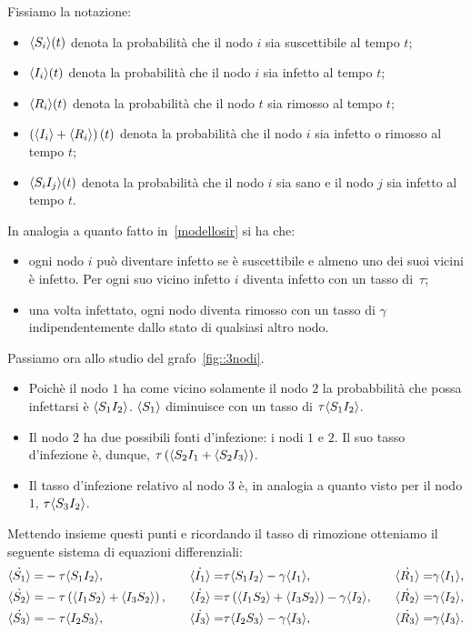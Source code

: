 Fissiamo la notazione:
\begin{itemize}
	\item  $\langle S_i \rangle(t)$  denota la probabilit\`a che il nodo $i$ sia suscettibile al tempo $t$;
	\item   $\langle I_i \rangle(t)$  denota la probabilit\`a che il nodo $i$ sia infetto al tempo $t$;
	\item  $\langle R_i \rangle(t)$  denota la probabilit\`a che il nodo $t$ sia rimosso al tempo $t$;
	\item $\left(  \langle  I_i \rangle+ \langle  R_i \rangle \right)(t)$ denota la probabilit\`a che il nodo $i$ sia infetto o rimosso al tempo $t$;
	\item $\langle S_iI_j \rangle(t)$ denota la probabilit\`a che il nodo $i$ sia sano e il nodo $j$ sia infetto al tempo $t$.
	\end{itemize}
In analogia a quanto fatto in~\ref{modellosir} si ha che:
\begin{itemize}
	\item ogni nodo $i$ pu\`o diventare infetto se \`e suscettibile e almeno uno dei suoi vicini \`e infetto. Per ogni suo vicino infetto $i$ diventa infetto con un tasso di~$\tau$;
	\item una volta infettato, ogni nodo diventa rimosso con un tasso di $\gamma$ indipendentemente dallo stato di qualsiasi altro nodo.
\end{itemize}
\newpage
Passiamo ora allo studio del grafo~\ref{fig::3nodi}.
\begin{itemize}
	

\item Poich\`e il nodo $1$ ha come vicino solamente il nodo $2$ la probabbilit\`a che possa infettarsi \`e $\langle S_1 I_2 \rangle $. $\langle S_1 \rangle$ diminuisce con un tasso di $\tau \langle S_1 I_2 \rangle$.
\item Il nodo $2$ ha due possibili fonti d'infezione: i nodi $1$ e $2$. Il suo tasso d'infezione \`e, dunque,  $\tau \left(  \langle{S_2I_1} + \langle S_2 I_3 \rangle \right)$.
\item Il tasso d'infezione relativo al nodo $3$ \`e,  
in analogia a quanto visto per il nodo $1$, $\tau\langle S_3I_2 \rangle$.
\end{itemize}
Mettendo insieme questi punti e ricordando il tasso di rimozione otteniamo il seguente sistema di equazioni differenziali:
\begin{equation*}
\begin{aligned}
	\dot{\langle S_1 \rangle} = & -\tau \langle  S_1 I_2 \rangle, 
\quad &
	\dot{\langle I_1 \rangle} = & \tau \langle S_1 I_2 \rangle-\gamma \langle I_1 \rangle, 
\quad & 
	\dot{\langle R_1 \rangle} = & \gamma \langle  I_1 \rangle,
\\
	\dot{\langle S_2 \rangle} = & -\tau \left(  \langle  I_1 S_2 \rangle + \langle I_3S_2 \rangle \right),	
\quad & 
	\dot{\langle I_2 \rangle} = & \tau \left(  \langle  I_1 S_2 \rangle + \langle I_3S_2 \rangle \right)-\gamma \langle I_2 \rangle,
\quad & 
	\dot{\langle R_2 \rangle} = & \gamma \langle  I_2 \rangle,
\\
	\dot{\langle S_3 \rangle} = & -\tau \langle  I_2 S_3 \rangle,
\quad & 
	\dot{\langle I_3 \rangle} = & \tau \langle  I_2 S_3 \rangle-\gamma \langle I_3 \rangle,
\quad & 
 	\dot{\langle R_3 \rangle} = & \gamma \langle  I_3 \rangle.
\end{aligned}
\end{equation*}
